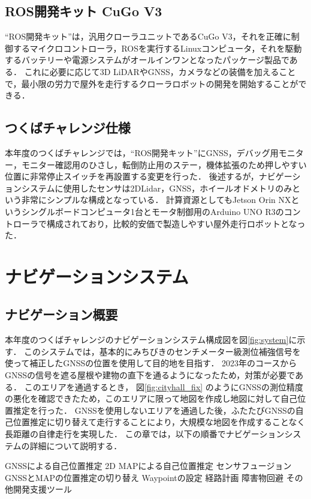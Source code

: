 \documentclass[platex,dvipdfmx]{rbproceedings}
\begin{document}
\subsection{ROS開発キット CuGo V3}
“ROS開発キット”は，汎用クローラユニットであるCuGo V3，それを正確に制御するマイクロコントローラ，ROSを実行するLinuxコンピュータ，それを駆動するバッテリーや電源システムがオールインワンとなったパッケージ製品である．
これに必要に応じて3D LiDARやGNSS，カメラなどの装備を加えることで，最小限の労力で屋外を走行するクローラロボットの開発を開始することができる．



\subsection{つくばチャレンジ仕様}
本年度のつくばチャレンジでは，“ROS開発キット”にGNSS，デバッグ用モニター，モニター確認用のひさし，転倒防止用のステー，機体拡張のため押しやすい位置に非常停止スイッチを再設置する変更を行った．
後述するが，ナビゲーションシステムに使用したセンサは2DLidar，GNSS，ホイールオドメトリのみという非常にシンプルな構成となっている．
計算資源としてもJetson Orin NXというシングルボードコンピュータ1台とモータ制御用のArduino UNO R3のコントローラで構成されており，比較的安価で製造しやすい屋外走行ロボットとなった．

\section{ナビゲーションシステム}
\subsection{ナビゲーション概要}
本年度のつくばチャレンジのナビゲーションシステム構成図を図\ref{fig:system}に示す．
このシステムでは，基本的にみちびきのセンチメーター級測位補強信号を使って補正したGNSSの位置を使用して目的地を目指す．
2023年のコースからGNSSの信号を遮る屋根や建物の直下を通るようになったため，対策が必要である．
このエリアを通過するとき， 図\ref{fig:cityhall_fix} のようにGNSSの測位精度の悪化を確認できたため，このエリアに限って地図を作成し地図に対して自己位置推定を行った．
GNSSを使用しないエリアを通過した後，ふたたびGNSSの自己位置推定に切り替えて走行することにより，大規模な地図を作成することなく長距離の自律走行を実現した．
この章では，以下の順番でナビゲーションシステムの詳細について説明する．

GNSSによる自己位置推定
2D MAPによる自己位置推定
センサフュージョン
GNSSとMAPの位置推定の切り替え
Waypointの設定
経路計画
障害物回避
その他開発支援ツール
\end{document}

